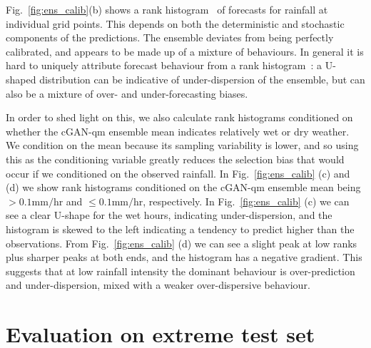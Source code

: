 \documentclass{article}
\begin{document}
Fig.~\ref{fig:ens_calib}(b) shows a rank histogram~\citep{wilks_forecast_2019} of forecasts for rainfall at individual grid points. This depends on both the deterministic and stochastic components of the predictions. The ensemble deviates from being perfectly calibrated, and appears to be made up of a mixture of behaviours. In general it is hard to uniquely attribute forecast behaviour from a rank histogram~\citep{hamill_interpretation_2001}: a U-shaped distribution can be indicative of under-dispersion of the ensemble, but can also be a mixture of over- and under-forecasting biases. 

In order to shed light on this, we also calculate rank histograms conditioned on whether the cGAN-qm ensemble mean indicates relatively wet or dry weather. We condition on the mean because its sampling variability is lower, and so using this as the conditioning variable greatly reduces the selection bias that would occur if we conditioned on the observed rainfall. In Fig.~\ref{fig:ens_calib} (c) and (d) we show rank histograms conditioned on the cGAN-qm ensemble mean being $>0.1\text{mm/hr}$ and $\leq 0.1\text{mm/hr}$, respectively. In Fig.~\ref{fig:ens_calib} (c) we can see a clear U-shape for the wet hours, indicating under-dispersion, and the histogram is skewed to the left indicating a tendency to predict higher than the observations. From Fig.~\ref{fig:ens_calib} (d) we can see a slight peak at low ranks plus sharper peaks at both ends, and the histogram has a negative gradient. This suggests that at low rainfall intensity the dominant behaviour is over-prediction and under-dispersion, mixed with a weaker over-dispersive behaviour.



\section{Evaluation on extreme test set}
\end{document}
